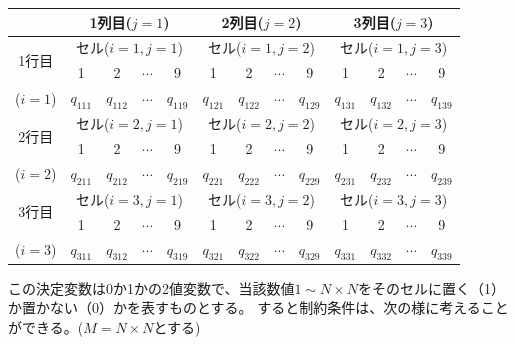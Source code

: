 \documentclass[uplatex,dvipdfmx,a4paper,11pt,oneside,openany]{jsbook}
\begin{document}
\begin{center}
\begin{tabular}{|c||c|c| c |c||c|c| c |c||c|c| c |c|} \hline
  &\multicolumn{4}{|c||}{1列目($j=1$)}&\multicolumn{4}{|c||}{2列目($j=2$)}&\multicolumn{4}{|c|}{3列目($j=3$)}\\\hline\hline
  \multirow{2}{*}{1行目}&\multicolumn{4}{|c||}{セル($i=1, j=1$)}&\multicolumn{4}{|c||}{セル($i=1, j=2$)}&\multicolumn{4}{|c|}{セル($i=1, j=3$)}\\\cline{2-13}
  &1&2& $\cdots$ &9& 1&2& $\cdots$ &9& 1&2&$\cdots$ &9 \\\cline{2-13}
  ($i=1$)&$q_{111}$&$q_{112}$& $\cdots$ &$q_{119}$& $q_{121}$&$q_{122}$&$\cdots$&$q_{129}$& $q_{131}$&$q_{132}$&$\cdots$&$q_{139}$ \\\hline\hline
  \multirow{2}{*}{2行目}&\multicolumn{4}{|c||}{セル($i=2, j=1$)}&\multicolumn{4}{|c||}{セル($i=2, j=2$)}&\multicolumn{4}{|c|}{セル($i=2, j=3$)}\\\cline{2-13}
  &1&2& $\cdots$ &9& 1&2& $\cdots$ &9& 1&2&$\cdots$ &9 \\\cline{2-13}
  ($i=2$)&$q_{211}$&$q_{212}$& $\cdots$ &$q_{219}$& $q_{221}$&$q_{222}$&$\cdots$&$q_{229}$& $q_{231}$&$q_{232}$&$\cdots$&$q_{239}$ \\\hline\hline
  \multirow{2}{*}{3行目}&\multicolumn{4}{|c||}{セル($i=3, j=1$)}&\multicolumn{4}{|c||}{セル($i=3, j=2$)}&\multicolumn{4}{|c|}{セル($i=3, j=3$)}\\\cline{2-13}
  &1&2& $\cdots$ &9& 1&2& $\cdots$ &9& 1&2&$\cdots$ &9 \\\cline{2-13}
  ($i=3$)&$q_{311}$&$q_{312}$& $\cdots$ &$q_{319}$& $q_{321}$&$q_{322}$&$\cdots$&$q_{329}$& $q_{331}$&$q_{332}$&$\cdots$&$q_{339}$ \\\hline
\end{tabular}
\end{center}

この決定変数は0か1かの2値変数で、当該数値$1\sim N\times N$をそのセルに置く（1）か置かない（0）かを表すものとする。
すると制約条件は、次の様に考えることができる。($M=N\times N$とする)
\end{document}
